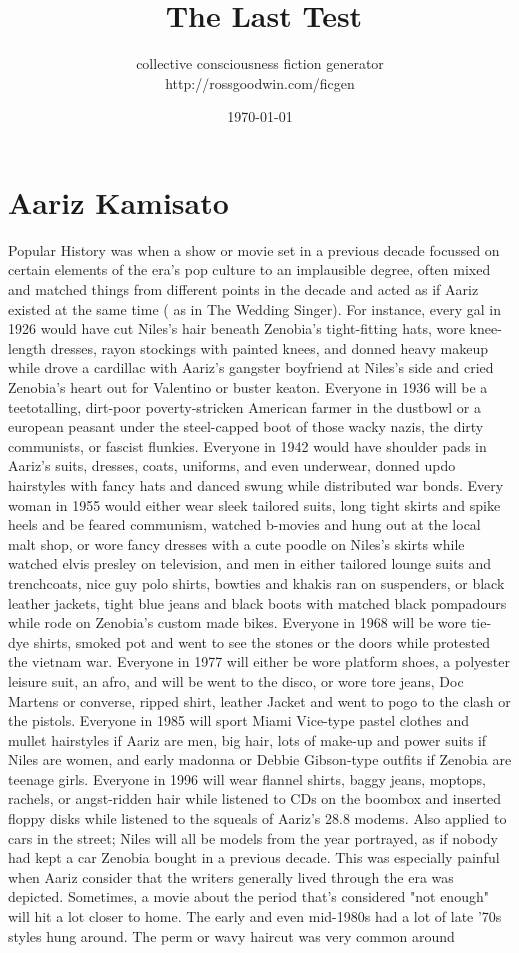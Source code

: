 \documentclass[12pt]{book}
\title{The Last Test}
\author{collective consciousness fiction generator\\http://rossgoodwin.com/ficgen}
\date{\today}
\begin{document}
\maketitle



\chapter{Aariz Kamisato}

Popular History was when a show or movie set in a previous decade focussed on certain elements of the era's pop culture to an implausible degree, often mixed and matched things from different points in the decade and acted as if Aariz existed at the same time ( as in The Wedding Singer). For instance, every gal in 1926 would have cut Niles's hair beneath Zenobia's tight-fitting hats, wore knee-length dresses, rayon stockings with painted knees, and donned heavy makeup while drove a cardillac with Aariz's gangster boyfriend at Niles's side and cried Zenobia's heart out for Valentino or buster keaton. Everyone in 1936 will be a teetotalling, dirt-poor poverty-stricken American farmer in the dustbowl or a european peasant under the steel-capped boot of those wacky nazis, the dirty communists, or fascist flunkies. Everyone in 1942 would have shoulder pads in Aariz's suits, dresses, coats, uniforms, and even underwear, donned updo hairstyles with fancy hats and danced swung while distributed war bonds. Every woman in 1955 would either wear sleek tailored suits, long tight skirts and spike heels and be feared communism, watched b-movies and hung out at the local malt shop, or wore fancy dresses with a cute poodle on Niles's skirts while watched elvis presley on television, and men in either tailored lounge suits and trenchcoats, nice guy polo shirts, bowties and khakis ran on suspenders, or black leather jackets, tight blue jeans and black boots with matched black pompadours while rode on Zenobia's custom made bikes. Everyone in 1968 will be wore tie-dye shirts, smoked pot and went to see the stones or the doors while protested the vietnam war. Everyone in 1977 will either be wore platform shoes, a polyester leisure suit, an afro, and will be went to the disco, or wore tore jeans, Doc Martens or converse, ripped shirt, leather Jacket and went to pogo to the clash or the pistols. Everyone in 1985 will sport Miami Vice-type pastel clothes and mullet hairstyles if Aariz are men, big hair, lots of make-up and power suits if Niles are women, and early madonna or Debbie Gibson-type outfits if Zenobia are teenage girls. Everyone in 1996 will wear flannel shirts, baggy jeans, moptops, rachels, or angst-ridden hair while listened to CDs on the boombox and inserted floppy disks while listened to the squeals of Aariz's 28.8 modems. Also applied to cars in the street; Niles will all be models from the year portrayed, as if nobody had kept a car Zenobia bought in a previous decade. This was especially painful when Aariz consider that the writers generally lived through the era was depicted. Sometimes, a movie about the period that's considered "not enough" will hit a lot closer to home. The early and even mid-1980s had a lot of late '70s styles hung around. The perm or wavy haircut was very common around 
\end{document}
